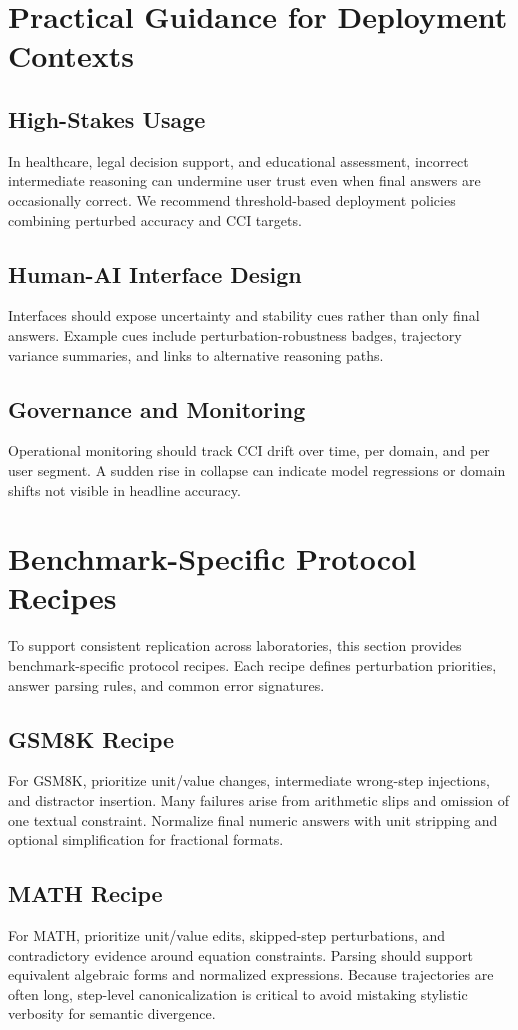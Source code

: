 \documentclass[conference]{IEEEtran}
\begin{document}
\section{Practical Guidance for Deployment Contexts}
\subsection{High-Stakes Usage}
In healthcare, legal decision support, and educational assessment, incorrect intermediate reasoning can undermine user trust even when final answers are occasionally correct. We recommend threshold-based deployment policies combining perturbed accuracy and CCI targets.

\subsection{Human-AI Interface Design}
Interfaces should expose uncertainty and stability cues rather than only final answers. Example cues include perturbation-robustness badges, trajectory variance summaries, and links to alternative reasoning paths.

\subsection{Governance and Monitoring}
Operational monitoring should track CCI drift over time, per domain, and per user segment. A sudden rise in collapse can indicate model regressions or domain shifts not visible in headline accuracy.

\section{Benchmark-Specific Protocol Recipes}
To support consistent replication across laboratories, this section provides benchmark-specific protocol recipes. Each recipe defines perturbation priorities, answer parsing rules, and common error signatures.

\subsection{GSM8K Recipe}
For GSM8K, prioritize unit/value changes, intermediate wrong-step injections, and distractor insertion. Many failures arise from arithmetic slips and omission of one textual constraint. Normalize final numeric answers with unit stripping and optional simplification for fractional formats.

\subsection{MATH Recipe}
For MATH, prioritize unit/value edits, skipped-step perturbations, and contradictory evidence around equation constraints. Parsing should support equivalent algebraic forms and normalized expressions. Because trajectories are often long, step-level canonicalization is critical to avoid mistaking stylistic verbosity for semantic divergence.
\end{document}
